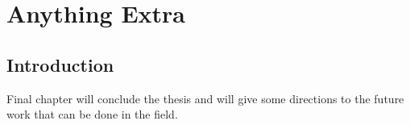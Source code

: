 \chapter{Anything Extra}
\section{Introduction}
Final chapter will conclude the thesis and will give some directions to the future work that can be done in the field.
